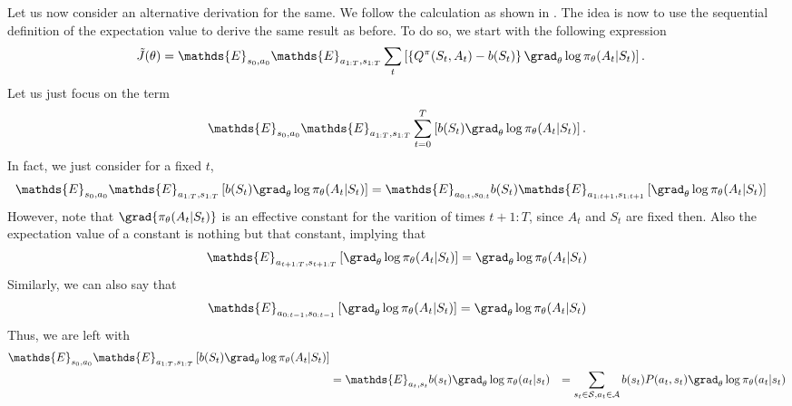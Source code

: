 \begin{tcolorbox}[title = Alternative derivation, breakable]
    Let us now consider an alternative derivation for the same. We follow the calculation as shown in \cite{daniel_takeshi:RL_GoingDeeper}.
    The idea is now to use the sequential definition of the expectation value to derive the same result as before.
    To do so, we start with the following expression
    \begin{align}
        \tilde{J}(\theta) &=  \mathds{E}_{s_0,a_0}  \mathds{E}_{a_{1:T},s_{1:T}} \sum_{t}\left[ \left\{Q^{\pi}(S_t,A_t)-b(S_t)\right\} \grad_{\theta}\log \pi_{\theta}(A_t|S_t)\right].
    \end{align} 
    Let us just focus on the term 
    \begin{align}
        \mathds{E}_{s_0,a_0} \mathds{E}_{a_{1:T},s_{1:T}} \sum^T_{t=0}\left[ b(S_t)\grad_{\theta}\log \pi_{\theta}(A_t|S_t)\right].
    \end{align} 
    In fact, we just consider for a fixed $t$, 
    \begin{align}
        \mathds{E}_{s_0,a_0} \mathds{E}_{a_{1:T},s_{1:T}} \left[ b(S_t)\grad_{\theta}\log \pi_{\theta}(A_t|S_t)\right] &=
        \mathds{E}_{a_{0:t},s_{0:t}} b(S_t)\mathds{E}_{a_{1:t+1},s_{1:t+1}}\left[ \grad_{\theta}\log \pi_{\theta}(A_t|S_t)\right]  
    \end{align}
    However, note that $\grad{\pi_{\theta}(A_t|S_t)}$ is an effective constant for the varition of times $t+1:T$, since $A_t$ and $S_t$ are fixed then. Also the expectation value of a constant is nothing but that constant, implying that 
    \begin{align}
        \mathds{E}_{a_{t+1:T},s_{t+1:T}}\left[ \grad_{\theta}\log \pi_{\theta}(A_t|S_t)\right] = \grad_{\theta}\log \pi_{\theta}(A_t|S_t)
    \end{align} 
    Similarly, we can also say that 
    \begin{align}
        \mathds{E}_{a_{0:t-1},s_{0:t-1}}\left[ \grad_{\theta}\log \pi_{\theta}(A_t|S_t)\right] = \grad_{\theta}\log \pi_{\theta}(A_t|S_t)
    \end{align}
    Thus, we are left with
    \begin{align}
        \mathds{E}_{s_0,a_0} \mathds{E}_{a_{1:T},s_{1:T}} \left[ b(S_t)\grad_{\theta}\log \pi_{\theta}(A_t|S_t)\right]\\
        &= \mathds{E}_{a_{t},s_{t}} b(s_t) \grad_{\theta}\log \pi_{\theta}(a_t|s_t)
        &=\sum_{s_t \in \mathcal{S},a_t\in\mathcal{A}}b(s_t) P(a_t,s_t) \grad_{\theta}\log \pi_{\theta}(a_t|s_t) \\

\end{align}
\end{tcolorbox}

